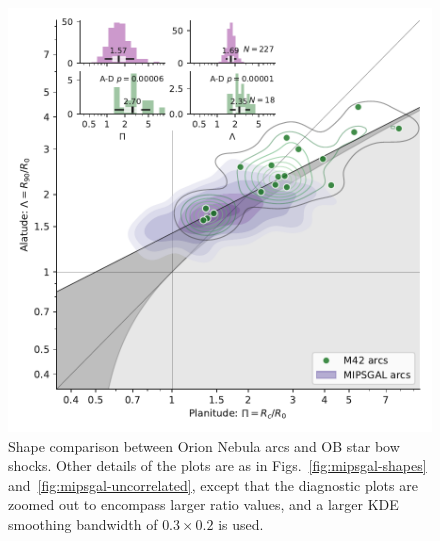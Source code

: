 \begin{figure}
  \centering
  \includegraphics[width=\linewidth]{figs/mipsgal-Rc-R90-vs-Orion}
  \caption[]{Shape comparison between Orion Nebula arcs and OB star
    bow shocks.  Other details of the plots are as in
    Figs.~\ref{fig:mipsgal-shapes} and~\ref{fig:mipsgal-uncorrelated},
    except that the diagnostic plots are zoomed out to encompass
    larger ratio values, and a larger KDE smoothing bandwidth of
    \(0.3 \times 0.2\) is used.}
  \label{fig:ll-compare-mipsgal}
\end{figure}


